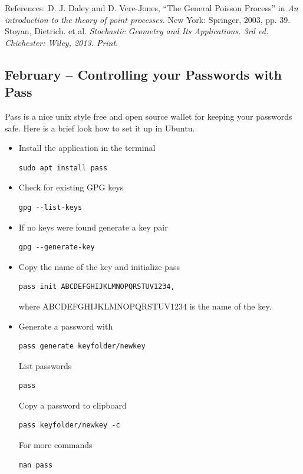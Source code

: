 \documentclass{article}
\begin{document}
References:
 D. J. Daley and D. Vere-Jones, ``The General Poisson Process'' in {\em An introduction to the theory of point processes.} New York: Springer, 2003, pp. 39. 
 Stoyan, Dietrich. et al. \em{Stochastic Geometry and Its Applications}. 3rd ed. Chichester: Wiley, 2013. Print.




\subsection{February – Controlling your Passwords with Pass}
Pass is a nice unix style free and open source wallet for keeping your passwords safe. Here is a brief look how to set it up in Ubuntu.

\begin{itemize}
\item Install the application in the terminal \\
\begin{verbatim}
sudo apt install pass  
\end{verbatim}
\item Check for existing GPG keys \\
\begin{verbatim}
gpg --list-keys 
\end{verbatim}
\item If no keys were found generate a key pair \\
\begin{verbatim}
gpg --generate-key
\end{verbatim}
\item Copy the name of the key and initialize pass\\
\begin{verbatim}
pass init ABCDEFGHIJKLMNOPQRSTUV1234, 
\end{verbatim}
where ABCDEFGHIJKLMNOPQRSTUV1234 is the name of the key.
\item Generate a password with \\
\begin{verbatim}
pass generate keyfolder/newkey 
\end{verbatim}
List passwords
\begin{verbatim}
pass
\end{verbatim}
Copy a password to clipboard \\
\begin{verbatim}
pass keyfolder/newkey -c
\end{verbatim}
For more commands
\begin{verbatim}
man pass
\end{verbatim}
\end{itemize}
\end{document}
